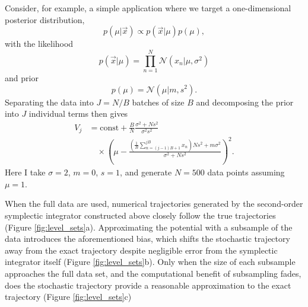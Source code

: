 \documentclass{article}
\begin{document}
Consider, for example, a simple application where we target a one-dimensional
posterior distribution,
%
\begin{equation} \label{posterior}
p \! \left( \mu | \vec{x} \right) \propto p \! \left( \vec{x} | \mu \right) p \! \left( \mu \right),
\end{equation}
%
with the likelihood
%
\begin{equation*}
p \! \left( \vec{x} | \mu \right) = \prod_{n = 1}^{N} \mathcal{N} \! \left( x_{n} | \mu, \sigma^{2} \right)
\end{equation*}
%
and prior
%
\begin{equation*}
p \! \left( \mu \right) = \mathcal{N} \! \left( \mu | m, s^{2} \right). 
\end{equation*}
%
Separating the data into $J = N / B$ batches of size $B$ and decomposing the
prior into $J$ individual terms then gives
%
\begin{align*}
V_{j} &= \mathrm{const} + 
\frac{B}{N} \frac{ \sigma^{2} + N s^{2}  }{ \sigma^{2} s^{2} }
\\
& \quad
\times \left( \mu - 
\frac{ \left( \frac{1}{B} \sum_{n = (j - 1) B + 1}^{j B} x_{n} \right) N s^{2}  + m \sigma^{2} }
{ \sigma^{2} + N s^{2} } 
\right)^{2}.
\end{align*}
%
Here I take $\sigma = 2$, $m = 0$, $s = 1$, and generate $N = 500$ data points
assuming $\mu = 1$.

When the full data are used, numerical trajectories generated by the second-order 
symplectic integrator constructed above closely follow the true trajectories 
(Figure \ref{fig:level_sets}a).  Approximating the potential with a subsample of the data 
introduces the aforementioned bias, which shifts the stochastic trajectory away from the 
exact trajectory despite negligible error from the symplectic integrator itself (Figure \ref{fig:level_sets}b).
Only when the size of each subsample approaches the full data set, and the computational
benefit of subsampling fades, does the stochastic trajectory provide a reasonable
approximation to the exact trajectory (Figure \ref{fig:level_sets}c)
\end{document}
